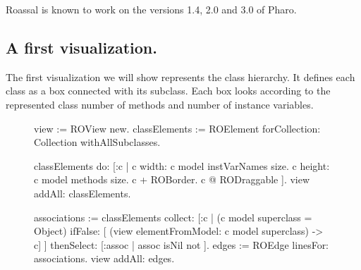 \documentclass[a4paper,10pt,twoside]{book}
\begin{document}
Roassal is known to work on the versions 1.4, 2.0 and 3.0 of Pharo.

\subsection{A first visualization.}

The first visualization we will show represents the  class hierarchy. It defines each class as a box connected with its subclass. Each box looks according to the represented class number of methods and number of instance variables.

\begin{figure}[H]
      \begin{minipage}[t]{0.5\textwidth}
      \vspace{0pt}
\begin{code}{}
view := ROView new.
classElements := ROElement forCollection: Collection withAllSubclasses.

classElements 
	do: [:c | 
		c width: c model instVarNames size.
		c height: c model methods size.
		c + ROBorder. 
		c @ RODraggable ].
view addAll: classElements.

associations := classElements collect: [:c | 
	(c model superclass = Object)
		ifFalse: [ (view elementFromModel: c model superclass) -> c]
	 ] thenSelect: [:assoc | assoc isNil not ].
edges := ROEdge linesFor: associations.
view addAll: edges.


\end{code}
\end{minipage}
\end{figure}
\end{document}
